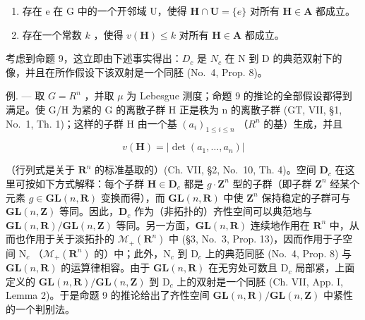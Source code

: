 \begin{enumerate}
\def\labelenumi{(\roman{enumi})}
\item
  存在 e 在 G 中的一个开邻域 U，使得 \(\mathbf{H} \cap \mathbf{U} = \{e\}\) 对所有 \(\mathbf{H} \in \mathbf{A}\) 都成立。
\item
  存在一个常数 \(k\) ，使得 \(v(\mathbf{H}) \leqslant k\) 对所有 \(\mathbf{H} \in \mathbf{A}\) 都成立。
\end{enumerate}

考虑到命题 9，这立即由下述事实得出：\(D_{c}\) 是 \(N_{c}\) 在 N 到 D 的典范双射下的像，并且在所作假设下该双射是一个同胚 (No.~4, Prop. 8)。

例. --- 取 \(G = R^{n}\) ，并取 \(\mu\) 为 Lebesgue 测度；命题 9 的推论的全部假设都得到满足。使 G/H 为紧的 G 的离散子群 H 正是秩为 n 的离散子群 (GT, VII, §1, No.~1, Th. 1)；这样的子群 H 由一个基 \((a_{i})_{1 \leqslant i \leqslant n}\) （\(R^{n}\) 的基）生成，并且

\[
v (\mathbf {H}) = | \det (a _ {1}, \dots , a _ {n}) |
\]

（行列式是关于 \(\mathbf{R}^n\) 的标准基取的）(Ch. VII, §2, No.~10, Th. 4)。空间 \(\mathbf{D}_c\) 在这里可按如下方式解释：每个子群 \(\mathbf{H} \in \mathbf{D}_c\) 都是 \(g \cdot \mathbf{Z}^n\) 型的子群（即子群 \(\mathbf{Z}^n\) 经某个元素 \(g \in \mathbf{GL}(n, \mathbf{R})\) 变换而得），而 \(\mathbf{GL}(n, \mathbf{R})\) 中使 \(\mathbf{Z}^n\) 保持稳定的子群可与 \(\mathbf{GL}(n, \mathbf{Z})\) 等同。因此，\(\mathbf{D}_c\) 作为（非拓扑的）齐性空间可以典范地与 \(\mathbf{GL}(n, \mathbf{R}) / \mathbf{GL}(n, \mathbf{Z})\) 等同。另一方面，\(\mathbf{GL}(n, \mathbf{R})\) 连续地作用在 \(\mathbf{R}^n\) 中，从而也作用于关于淡拓扑的 \(\mathcal{M}_{+}(\mathbf{R}^{n})\) 中 (§3, No.~3, Prop. 13)，因而作用于子空间 \(\mathrm{N}_c\) （\(\mathcal{M}_{+}(\mathbf{R}^{n})\) 的）中；此外，\(\mathrm{N}_c\) 到 \(\mathrm{D}_c\) 上的典范同胚 (No.~4, Prop. 8) 与 \(\mathbf{GL}(n, \mathbf{R})\) 的运算律相容。由于 \(\mathbf{GL}(n, \mathbf{R})\) 在无穷处可数且 \(\mathrm{D}_c\) 局部紧，上面定义的 \(\mathbf{GL}(n, \mathbf{R}) / \mathbf{GL}(n, \mathbf{Z})\) 到 \(\mathrm{D}_c\) 上的双射是一个同胚 (Ch. VII, App. I, Lemma 2)。于是命题 9 的推论给出了齐性空间 \(\mathbf{GL}(n, \mathbf{R}) / \mathbf{GL}(n, \mathbf{Z})\) 中紧性的一个判别法。

